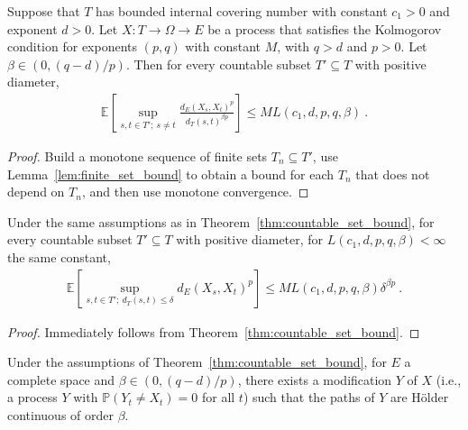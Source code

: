 \begin{theorem}\label{thm:countable_set_bound}
  \leanok
Suppose that $T$ has bounded internal covering number with constant $c_1>0$ and exponent $d > 0$.
Let $X : T \to \Omega \to E$ be a process that satisfies the Kolmogorov condition for exponents $(p,q)$ with constant $M$, with $q > d$ and $p > 0$.
Let $\beta \in(0, (q - d)/p)$.
Then for every countable subset $T' \subseteq T$ with positive diameter,
\begin{align*}
  \mathbb{E}\left[ \sup_{s, t \in T';\: s \ne t} \frac{d_E(X_s, X_t)^p}{d_T(s, t)^{\beta p}} \right]
  \le M L(c_1, d, p, q, \beta)
  \: .
\end{align*}
\end{theorem}

\begin{proof}\leanok
Build a monotone sequence of finite sets $T_n \subseteq T'$, use Lemma~\ref{lem:finite_set_bound} to obtain a bound for each $T_n$ that does not depend on $T_n$, and then use monotone convergence.
\end{proof}


\begin{corollary}\label{cor:countable_set_bound_of_le}
Under the same assumptions as in Theorem~\ref{thm:countable_set_bound}, for every countable subset $T' \subseteq T$ with positive diameter, for $L(c_1, d, p, q, \beta) < \infty$ the same constant,
\begin{align*}
  \mathbb{E}\left[ \sup_{s, t \in T';\: d_T(s, t) \le \delta} d_E(X_s, X_t)^p \right]
  \le M L(c_1, d, p, q, \beta) \delta^{\beta p}
  \: .
\end{align*}
\end{corollary}

\begin{proof}
Immediately follows from Theorem~\ref{thm:countable_set_bound}.
\end{proof}


\begin{lemma}\label{lem:holder_modification_single}
  \leanok
Under the assumptions of Theorem~\ref{thm:countable_set_bound}, for $E$ a complete space and $\beta \in (0, (q - d)/p)$, there exists a modification $Y$ of $X$ (i.e., a process $Y$ with $\mathbb{P}(Y_t \ne X_t) = 0$ for all $t$) such that the paths of $Y$ are Hölder continuous of order $\beta$.
\end{lemma}

